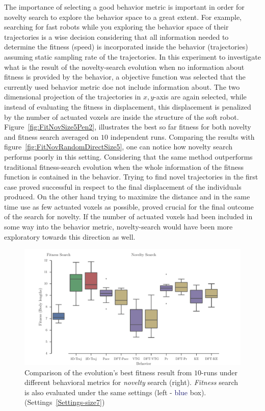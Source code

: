 The importance of selecting a good behavior metric is important in order for novelty search to explore the behavior space to a great extent. For example, searching for fast robots while you exploring the behavior space of their trajectories is a wise decision considering that all information needed to determine the fitness (speed) is incorporated inside the behavior (trajectories) assuming static sampling rate of the trajectories. In this experiment to investigate what is the result of the novelty-search evolution when no information about fitness is provided by the behavior, a objective function was selected that the currently used behavior metric doe not include information about. The two dimensional projection of the trajectories in $x,y$-axis are again selected, while instead of evaluating the fitness in displacement, this displacement is penalized by the number of actuated voxels are inside the structure of the soft robot. Figure~\ref{fig:FitNovSize5Pen2}, illustrates the best so far fitness for both novelty and fitness search averaged on $10$ independent runs. Comparing the results with figure~\ref{fig:FitNovRandomDirectSize5}, one can notice how novelty search performs poorly in this setting. Considering that the same method outperforms traditional fitness-search evolution when the whole information of the fitness function is contained in the behavior. Trying to find novel trajectories in the first case proved successful in respect to the final displacement of the individuals produced. On the other hand trying to maximize the distance and in the same time use as few actuated voxels as possible, proved crucial for the final outcome of the search for novelty. If the number of actuated voxels had been included in some way into the behavior metric, novelty-search would have been more exploratory towards this direction as well.


\begin{figure}[t!]
\centering
\includegraphics[width=1.0\textwidth]{../Figures/Results/BehaviorsPerformance.pdf}
\caption{Comparison of the evolution's best fitness result from $10$-runs under different behavioral metrics for \emph{novelty} search (right). \emph{Fitness} search is also evaluated under the same settings (left - \textcolor{MidnightBlue}{blue} box). (Settings~\ref{Settings-size7})}
\label{fig:BehaviorsPerformance}
\end{figure}


